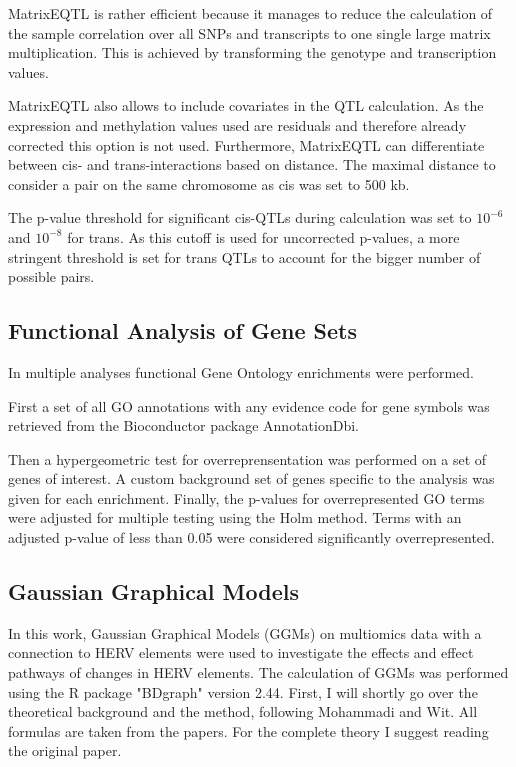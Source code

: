 \documentclass[a4paper,12pt,twoside,openright]{article}
\begin{document}
MatrixEQTL is rather efficient because it manages to reduce the calculation of the sample correlation over all SNPs and transcripts to one single large matrix multiplication. This is achieved by transforming the genotype and transcription values. 

MatrixEQTL also allows to include covariates in the QTL calculation. As the expression and methylation values used are residuals and therefore already corrected this option is not used. Furthermore, MatrixEQTL can differentiate between cis- and trans-interactions based on distance. The maximal distance to consider a pair on the same chromosome as cis was set to 500 kb. 

The p-value threshold for significant cis-QTLs during calculation was set to $10^{-6}$ and $10^{-8}$ for trans. As this cutoff is used for uncorrected p-values, a more stringent threshold is set for trans QTLs to account for the bigger number of possible pairs. 



\subsection{Functional Analysis of Gene Sets}
\label{Methods:Functional Analysis of Gene Sets}
In multiple analyses functional Gene Ontology enrichments were performed.

First a set of all GO annotations with any evidence code for gene symbols  was retrieved from the Bioconductor package AnnotationDbi\cite{AnnotationDbi}. 

Then a hypergeometric test\cite{GOstats} for overreprensentation was performed on a set of genes of interest. A custom background set of genes specific to the analysis was given for each enrichment. Finally, the p-values for overrepresented GO terms were adjusted for multiple testing using the Holm method\cite{10.2307/4615733}. Terms with an adjusted p-value of less than 0.05 were considered significantly overrepresented. 

\subsection{Gaussian Graphical Models}
\label{Methods:Gaussian Graphical Models}
In this work, Gaussian Graphical Models (GGMs) on multiomics data with a connection to HERV elements were used to investigate the effects and effect pathways of changes in HERV elements. The calculation of GGMs was performed using the R package "BDgraph" version 2.44\cite{Mohammadi2015BDgraphAR}. First, I will shortly go over the theoretical background and the method, following Mohammadi and Wit\cite{Mohammadi2015,Mohammadi2015BDgraphAR}. All formulas are taken from the papers. For the complete theory I suggest reading the original paper\cite{Mohammadi2015}.
\end{document}
